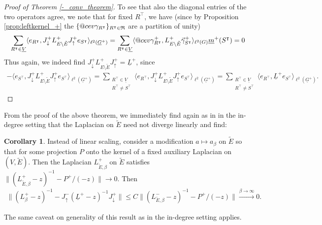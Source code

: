 \documentclass[reqno,12pt,letterpaper]{amsart}
\makeatletter
\numberwithin{equation}{section}
\newcommand{\Lin}{L^{-}}
\newcommand{\Lout}{L^{+}}
\DeclareRobustCommand{\cev}[1]{%
	\mathpalette\do@cev{#1}%
}
\newcommand{\do@cev}[2]{%
	\fix@cev{#1}{+}%
	\reflectbox{$\m@th#1\vec{\reflectbox{$\fix@cev{#1}{-}\m@th#1#2\fix@cev{#1}{+}$}}$}%
	\fix@cev{#1}{-}%
}
\newcommand{\fix@cev}[2]{%
	\ifx#1\displaystyle
	\mkern#23mu
	\else
	\ifx#1\textstyle
	\mkern#23mu
	\else
	\ifx#1\scriptstyle
	\mkern#22mu
	\else
	\mkern#22mu
	\fi
	\fi
	\fi
}
\newcommand{\1}{\mathds{1}}
\theoremstyle{definition}
\newtheorem{Cor}[Th]{Corollary}
\makeatother
\begin{document}
\begin{proof}[Proof of Theorem \ref{-_conv_theorem}]
To see that also the diagonal entries of the two operators agree, we note that for fixed $R^\intercal$, we have (since by Proposition \ref{prop:leftkernel_+} the $\{\cev{\gamma}_{R^\intercal}\}_{R^\intercal \in \mathfrak{R}}$ are a  partition of unity)
\begin{align}
	\sum_{R^\intercal \in \underline{V}} \langle e_{R^\intercal}, J^+_{\downarrow} \Lout_{E\setminus \tilde{E}}  J^+_\uparrow e_{S^\intercal}\rangle_{\ell^2(\underline{G}^+)} 
	=   \sum_{R^\intercal \in \underline{V}} \langle\cev{\gamma}^+_{R^\intercal},  \Lout_{E\setminus \tilde{E}} \vec{\gamma}^+_{S^\intercal} \rangle_{\ell^2(G)}  \underline{m}^+(S^\intercal)
	= 0
\end{align}
Thus again, we indeed find $J^+_{\downarrow} \Lout_{E\setminus \tilde{E}}  J^+_\uparrow = \underline{L}^+$, since
\begin{align}
	-\langle e_{S^\intercal}, J^+_{\downarrow} \Lout_{E\setminus \tilde{E}}  J^+_\uparrow e_{S^\intercal}\rangle_{\ell^2(\underline{G}^+)}  
	= \sum_{\substack{R^\intercal \in \underline{V} \\ R^\intercal \neq S^\intercal}} \langle e_{R^\intercal}, J^+_{\downarrow} \Lout_{E\setminus \tilde{E}}  J^+_\uparrow e_{S^\intercal}\rangle_{\ell^2(\underline{G}^+)}  
	= \sum_{\substack{R^\intercal \in \underline{V} \\ R^\intercal \neq S^\intercal}} \langle e_{R^\intercal}, \underline{L}^+ e_{S^\intercal}\rangle_{\ell^2(\underline{G}^+)}.
\end{align}
	\end{proof}

	
	From the proof of the above theorem, we immediately find again as in in the in-degree setting that 
	the Laplacian on $\tilde{E}$ need not diverge linearly and find:
	
	\begin{Cor}
		Instead of linear scaling, consider a modification $a \mapsto a_\beta$ on $\tilde{E}$ so that for some projection $P$ onto the kernel of a fixed auxiliary Laplacian on $(V,\tilde{E})$. Then  the  Laplacian $\Lout_{\tilde{E}, \beta}$ on $\tilde{E}$ satisfies $\| (\Lout_{\tilde{E},\beta} -z)^{-1} - P^+/(-z)\| \rightarrow 0$. Then
		\begin{align}
			\| (\Lout_\beta - z)^{-1} - J^-_{\uparrow} (\underline{L}^+ -z)^{-1}  J^+_\downarrow \|\leq C \| (\Lin_{\tilde{E},\beta} -z)^{-1} - P^+/(-z)\| \xrightarrow{\beta \rightarrow \infty} 0.
		\end{align}
	\end{Cor}
\noindent The same caveat on generality of this result as in the in-degree setting applies.
	
\end{document}
